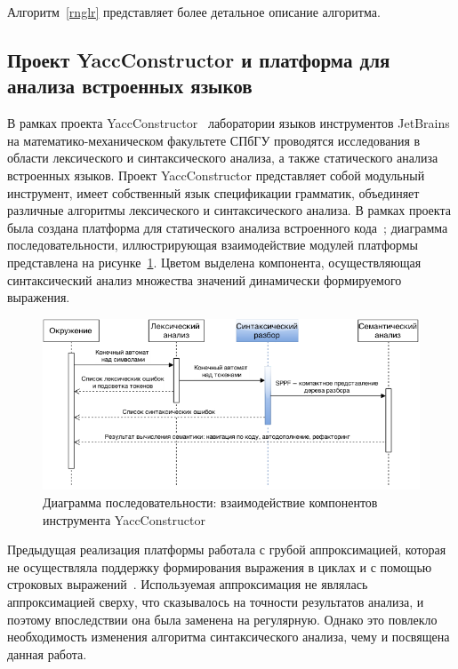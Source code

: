 Алгоритм~\ref{rnglr} представляет более детальное описание алгоритма.

\subsection{Проект YaccConstructor и платформа для анализа встроенных языков}
В рамках проекта YaccConstructor~\cite{YC} лаборатории языков инструментов JetBrains на математико-механическом факультете СПбГУ проводятся исследования в области лексического и синтаксического анализа, а также статического анализа встроенных языков. Проект YaccConstructor представляет собой модульный инструмент, имеет собственный язык спецификации грамматик, объединяет различные алгоритмы лексического и синтаксического анализа. В рамках проекта была создана платформа для статического анализа встроенного кода~\cite{SECR14}; диаграмма последовательности, иллюстрирующая взаимодействие модулей платформы представлена на рисунке~\ref{seq}. Цветом выделена компонента, осуществляющая синтаксический анализ множества значений динамически формируемого выражения. 
\begin{figure}[!h]
 \centering
 \includegraphics[width=15cm]{pics/Seq_rus.png}
 \caption{Диаграмма последовательности: взаимодействие компонентов
инструмента YaccConstructor}
 \label{seq}
\end{figure}

Предыдущая реализация платформы работала с грубой аппроксимацией, которая не осуществляла поддержку формирования выражения в циклах и с помощью строковых выражений~\cite{SECR13}. Используемая аппроксимация не являлась аппроксимацией сверху, что сказывалось на точности результатов анализа, и поэтому впоследствии она была заменена на регулярную. Однако это повлекло необходимость изменения алгоритма синтаксического анализа, чему и посвящена данная работа. 